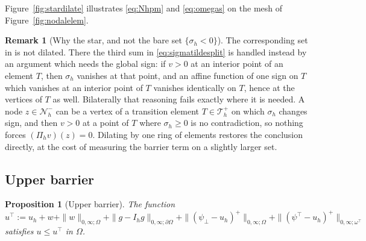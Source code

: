 \documentclass[12pt]{amsart}
\newtheorem{proposition}{Proposition}
\theoremstyle{definition}
\newtheorem{remark}{Remark}
\newcommand{\Om}{\Omega}
\newcommand{\dOm}{\partial\Omega}
\newcommand{\psilo}{\psi_\bot}
\newcommand{\psiup}{\psi^\top}
\newcommand{\Th}{\mathcal{T}_h}
\newcommand{\Nh}{\mathcal{N}_h}
\newcommand{\Ih}{I_h}
\newcommand{\Pih}{\Pi_h}
\newcommand{\Thplus}{\Th^+}
\newcommand{\omtop}{\omega^\top}
\begin{document}
Figure~\ref{fig:stardilate} illustrates \eqref{eq:Nhpm} and \eqref{eq:omegas} on the mesh of Figure~\ref{fig:nodalelem}.



\begin{remark}[Why the star, and not the bare set $\{\sigma_h<0\}$]
\label{rem:whystar}
The corresponding set in \cite[formula (4.6)]{NSV03} is not dilated.  There the third sum in \eqref{eq:sigmatildesplit} is handled instead by an argument which needs the global sign: if $v > 0$ at an interior point of an element $T$, then $\sigma_h$ vanishes at that point, and an affine function of one sign on $T$ which vanishes at an interior point of $T$ vanishes identically on $T$, hence at the vertices of $T$ as well.  Bilaterally that reasoning fails exactly where it is needed.  A node $z \in \Nh^-$ can be a vertex of a transition element $T \in \Thplus$ on which $\sigma_h$ changes sign, and then $v > 0$ at a point of $T$ where $\sigma_h \ge 0$ is no contradiction, so nothing forces $(\Pih v)(z) = 0$.  Dilating by one ring of elements restores the conclusion directly, at the cost of measuring the barrier term on a slightly larger set.
\end{remark}


\subsection{Upper barrier}

\begin{proposition}[Upper barrier]
\label{prop:upperbarrier}
The function
\begin{equation}
\label{eq:ubarupper}
  u^\top := u_h + w + \|w\|_{0,\infty;\Om} + \|g-\Ih g\|_{0,\infty;\dOm} + \|(\psilo-u_h)^+\|_{0,\infty;\Om} + \|(\psiup-u_h)^+\|_{0,\infty;\omtop}
\end{equation}
satisfies $u \le u^\top$ in $\Om$.
\end{proposition}
\end{document}
